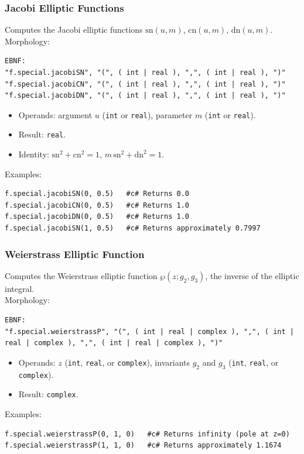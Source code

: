 \subsubsection{Jacobi Elliptic Functions}
Computes the Jacobi elliptic functions $\text{sn}(u, m)$, $\text{cn}(u, m)$, $\text{dn}(u, m)$. \\
Morphology:
\begin{verbatim}
EBNF:
"f.special.jacobiSN", "(", ( int | real ), ",", ( int | real ), ")"
"f.special.jacobiCN", "(", ( int | real ), ",", ( int | real ), ")"
"f.special.jacobiDN", "(", ( int | real ), ",", ( int | real ), ")"
\end{verbatim}
\begin{itemize}
\item Operands: argument $u$ (\texttt{int} or \texttt{real}), parameter $m$ (\texttt{int} or \texttt{real}).
\item Result: \texttt{real}.
\item Identity: $\text{sn}^2 + \text{cn}^2 = 1$, $m\,\text{sn}^2 + \text{dn}^2 = 1$.
\end{itemize}
Examples:
\begin{verbatim}
f.special.jacobiSN(0, 0.5)   #c# Returns 0.0
f.special.jacobiCN(0, 0.5)   #c# Returns 1.0
f.special.jacobiDN(0, 0.5)   #c# Returns 1.0
f.special.jacobiSN(1, 0.5)   #c# Returns approximately 0.7997
\end{verbatim}

\subsubsection{Weierstrass Elliptic Function}
Computes the Weierstrass elliptic function $\wp(z; g_2, g_3)$, the inverse of the elliptic integral. \\
Morphology:
\begin{verbatim}
EBNF:
"f.special.weierstrassP", "(", ( int | real | complex ), ",", ( int | real | complex ), ",", ( int | real | complex ), ")"
\end{verbatim}
\begin{itemize}
\item Operands: $z$ (\texttt{int}, \texttt{real}, or \texttt{complex}), invariants $g_2$ and $g_3$ (\texttt{int}, \texttt{real}, or \texttt{complex}).
\item Result: \texttt{complex}.
\end{itemize}
Examples:
\begin{verbatim}
f.special.weierstrassP(0, 1, 0)   #c# Returns infinity (pole at z=0)
f.special.weierstrassP(1, 1, 0)   #c# Returns approximately 1.1674
\end{verbatim}

